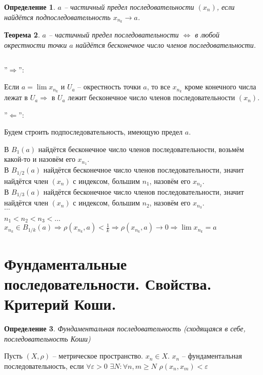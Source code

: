 \documentclass[12pt,letterpaper]{report}
\makeatletter
\newtheorem{theorem}{Теорема}
\newtheorem{conj}[theorem]{Определение}
\renewenvironment{proof}[1][\proofname]{%
   \par\pushQED{\qed}\normalfont%
   \topsep6\p@\@plus6\p@\relax
   \trivlist\item[\hskip\labelsep\bfseries#1\@addpunct{.}]%
   \ignorespaces
}{%
   \popQED\endtrivlist\@endpefalse
}
\makeatother
\begin{document}
\begin{conj}
$a$ -- частичный предел последовательности $(x_n)$, если найдётся
подпоследовательность $x_{n_k} \rightarrow a$.
\end{conj}
\begin{theorem}
$a$ -- частичный предел последовательности $\Leftrightarrow$
в любой окрестности точки $a$ найдётся бесконечное число членов
последовательности.
\end{theorem}
\begin{proof} $ $

    ''$\Longrightarrow$'':

    Если $a = \lim x_{n_k}$ и $U_a$ -- окрестность точки $a$, то
    все $x_{n_k}$ кроме конечного числа лежат в $U_a \Rightarrow$
    в $U_a$ лежит бесконечное число членов последовательности $(x_n)$.

    ''$\Longleftarrow$'':

    Будем строить подпоследовательность, имеющую предел $a$.

    В $B_{1}(a)$ найдётся бесконечное число членов последовательности,
    возьмём какой-то и назовём его $x_{n_1}$.\\
    В $B_{1/2}(a)$ найдётся бесконечное число членов
    последовательности, значит найдётся член $(x_n)$ с индексом, большим
    $n_1$, назовём его $x_{n_2}$.\\
    В $B_{1/3}(a)$ найдётся бесконечное число членов
    последовательности, значит найдётся член $(x_n)$ с индексом, большим
    $n_2$, назовём его $x_{n_3}$.\\
    $\dots$

    $n_1 < n_2 < n_3 < \dots$\\
    $x_{n_k} \in B_{1/k}(a) \Rightarrow \rho(x_{n_k}, a) < \frac1k
    \Rightarrow \rho(x_{n_k}, a) \rightarrow 0 \Rightarrow
    \lim x_{n_k} = a$

\end{proof}

\section{Фундаментальные последовательности. Свойства. Критерий Коши.}

\begin{conj}
Фундаментальная последовательность (сходящаяся в себе,
последовательность Коши)
\end{conj}
Пусть $(X, \rho)$ -- метрическое пространство. $x_n \in X$.
$x_n$ -- фундаментальная последовательность, если $\forall
\varepsilon > 0 \,\, \exists N : \forall n, m \geq N \,\,
\rho(x_n, x_m) < \varepsilon$
\end{document}
